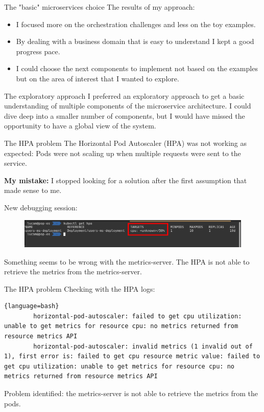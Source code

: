 \documentclass{beamer}
\begin{document}
\begin{frame}{The "basic" microservices choice}
	The results of my approach:
	\begin{itemize}
		\item I focused more on the orchestration challenges and less on the toy examples.
		\item By dealing with a business domain that is easy to understand I kept a good progress pace.
		\item I could choose the next components to implement not based on the examples but on the area of interest that I wanted to explore.
	\end{itemize}
\end{frame}

\begin{frame}{The exploratory approach}
	I preferred an exploratory approach to get a basic understanding of multiple components of the microservice architecture.
	\newline \newline
	I could dive deep into a smaller number of components, but I would have missed the opportunity to have a global view of the system.
\end{frame}

\begin{frame}{The HPA problem}
The Horizontal Pod Autoscaler (HPA) was not working as expected: Pods were not scaling up when multiple requests were sent to the service.
\begin{block}{}
	\textbf{My mistake:} I stopped looking for a solution after the first assumption that made sense to me.
\end{block}
New debugging session:
\begin{figure}
	\centering
	\includegraphics[width=1\linewidth]{./images/hpaProblem.png}
\end{figure}
Something seems to be wrong with the metrics-server. The HPA is not able to retrieve the metrics from the metrics-server.
\end{frame}

\begin{frame}[fragile]{The HPA problem}
Checking with the HPA logs:
	\begin{lstlisting}{language=bash}
		horizontal-pod-autoscaler: failed to get cpu utilization: unable to get metrics for resource cpu: no metrics returned from resource metrics API
		horizontal-pod-autoscaler: invalid metrics (1 invalid out of 1), first error is: failed to get cpu resource metric value: failed to get cpu utilization: unable to get metrics for resource cpu: no metrics returned from resource metrics API
	\end{lstlisting}

	\begin{block}{}
		Problem identified: the metrics-server is not able to retrieve the metrics from the pods.
	\end{block}
\end{frame}
\end{document}
